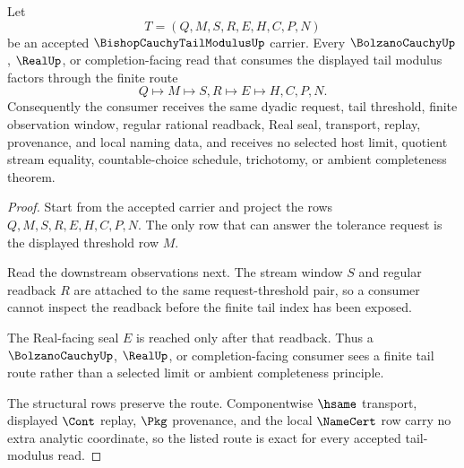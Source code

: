 \begin{theorem}
\label{thm:bishop-cauchy-tail-modulus-finite-tail-exactness}
Let
$$
T=(Q,M,S,R,E,H,C,P,N)
$$
be an accepted $\BishopCauchyTailModulusUp$ carrier. Every $\BolzanoCauchyUp$, $\RealUp$, or completion-facing read that consumes the displayed tail modulus factors through the finite route
$$
Q \longmapsto M \longmapsto S,R \longmapsto E \longmapsto H,C,P,N .
$$
Consequently the consumer receives the same dyadic request, tail threshold, finite observation window, regular rational readback, Real seal, transport, replay, provenance, and local naming data, and receives no selected host limit, quotient stream equality, countable-choice schedule, trichotomy, or ambient completeness theorem.
\end{theorem}
\begin{proof}
Start from the accepted carrier and project the rows $Q,M,S,R,E,H,C,P,N$. The only row that can answer the tolerance request is the displayed threshold row $M$.

Read the downstream observations next. The stream window $S$ and regular readback $R$ are attached to the same request-threshold pair, so a consumer cannot inspect the readback before the finite tail index has been exposed.

The Real-facing seal $E$ is reached only after that readback. Thus a $\BolzanoCauchyUp$, $\RealUp$, or completion-facing consumer sees a finite tail route rather than a selected limit or ambient completeness principle.

The structural rows preserve the route. Componentwise $\hsame$ transport, displayed $\Cont$ replay, $\Pkg$ provenance, and the local $\NameCert$ row carry no extra analytic coordinate, so the listed route is exact for every accepted tail-modulus read.
\end{proof}


\begin{closurestatus}{\BishopCauchyTailModulusUp}
  \theoryclosure{\seedClosure}
  \formalstatus{\unformalizedV}
\end{closurestatus}
